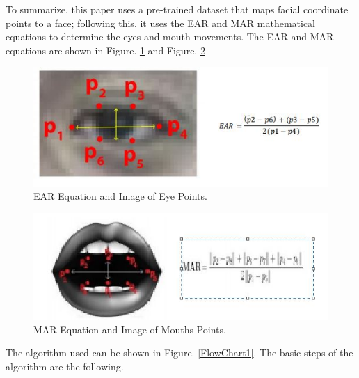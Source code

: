 \documentclass[conference]{IEEEtran}
\begin{document}
To summarize, this paper uses a pre-trained dataset that maps facial coordinate points to a face; following this, it uses the EAR and MAR mathematical equations to determine the eyes and mouth movements. The EAR and MAR equations are shown in Figure. \ref{EAR} and Figure. \ref{MAR}

\begin{figure}[htbp]
\includegraphics[width=\columnwidth]{EAR.JPG}
\caption{EAR Equation and Image of Eye Points.}
\label{EAR}
\end{figure}

\begin{figure}[htbp]
\includegraphics[width=\columnwidth]{MAR.JPG}
\caption{MAR Equation and Image of Mouths Points.}
\label{MAR}
\end{figure}
    
The algorithm used can be shown in Figure. \ref{FlowChart1}. The basic steps of the algorithm are the following.
\end{document}
